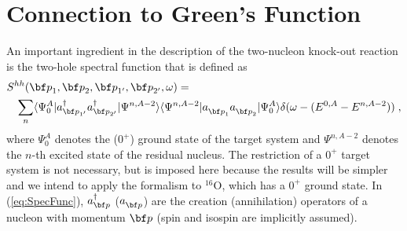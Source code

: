 \section{Connection to Green's Function}
An important ingredient in the description of the two-nucleon knock-out 
reaction is the two-hole spectral function that is defined as
%
	\begin{eqnarray}
	\lefteqn{%
		S^{hh}(\rvec{p}_1, \rvec{p}_2, \rvec{p}_{1'}, \rvec{p}_{2'}, 
		\omega )
	=} 
	\label{eq:SpecFunc}
	\\
	&&
		\sum_n
		\ME<\Psi^A_0| \Oc{\rvec{p}_{1'}} \Oc{\rvec{p}_{2'}}|%
		\Psi^{n,A-2} >
		\ME<\Psi^{n,A-2}| \Oa{\rvec{p}_1} \Oa{\rvec{p}_2}|%
		\Psi^A_0 >
		\delta( \omega - (E^{0,A} - E^{n,A-2}) )
	\nonumber
	\;,
	\end{eqnarray}
%
where $\Psi^A_0$ denotes the ($0^+$) ground state of the target system 
 and $\Psi^{n,A-2}$ denotes the $n$-th excited state
of the residual nucleus. The restriction of a $0^+$
target system is not necessary, but is imposed here because the results will
be simpler and we intend to apply the formalism to $^{16}$O, which has a
 $0^+$ ground state. In (\ref{eq:SpecFunc}), 
 $\Oc{\rvec{p}}$ ($\Oa{\rvec{p}}$) are
the creation (annihilation) operators of a nucleon with momentum $\rvec{p}$
(spin and isospin are implicitly assumed).

